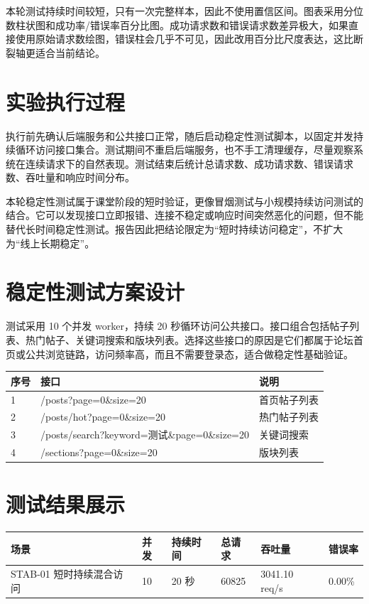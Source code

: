 \documentclass[UTF8,a4paper,12pt]{ctexart}
\begin{document}
本轮测试持续时间较短，只有一次完整样本，因此不使用置信区间。图表采用分位数柱状图和成功率/错误率百分比图。成功请求数和错误请求数差异极大，如果直接使用原始请求数绘图，错误柱会几乎不可见，因此改用百分比尺度表达，这比断裂轴更适合当前结论。

\section{实验执行过程}
执行前先确认后端服务和公共接口正常，随后启动稳定性测试脚本，以固定并发持续循环访问接口集合。测试期间不重启后端服务，也不手工清理缓存，尽量观察系统在连续请求下的自然表现。测试结束后统计总请求数、成功请求数、错误请求数、吞吐量和响应时间分布。

本轮稳定性测试属于课堂阶段的短时验证，更像冒烟测试与小规模持续访问测试的结合。它可以发现接口立即报错、连接不稳定或响应时间突然恶化的问题，但不能替代长时间稳定性测试。报告因此把结论限定为“短时持续访问稳定”，不扩大为“线上长期稳定”。

\section{稳定性测试方案设计}
测试采用 10 个并发 worker，持续 20 秒循环访问公共接口。接口组合包括帖子列表、热门帖子、关键词搜索和版块列表。选择这些接口的原因是它们都属于论坛首页或公共浏览链路，访问频率高，而且不需要登录态，适合做稳定性基础验证。

\begin{longtable}{P{1.2cm}P{9.2cm}P{3.3cm}}
\toprule
序号 & 接口 & 说明\\
 & /posts?page=0\&size=20 & 首页帖子列表\\
2 & /posts/hot?page=0\&size=20 & 热门帖子列表\\
3 & /posts/search?keyword=测试\&page=0\&size=20 & 关键词搜索\\
4 & /sections?page=0\&size=20 & 版块列表\\
\bottomrule
\end{longtable}

\section{测试结果展示}
\begin{longtable}{P{3.2cm}P{1.8cm}P{2.0cm}P{2.0cm}P{2.0cm}P{2.0cm}}
\toprule
场景 & 并发 & 持续时间 & 总请求 & 吞吐量 & 错误率\\
\midrule
STAB-01 短时持续混合访问 & 10 & 20 秒 & 60825 & 3041.10 req/s & 0.00\%\\
\bottomrule
\end{longtable}
\end{document}
